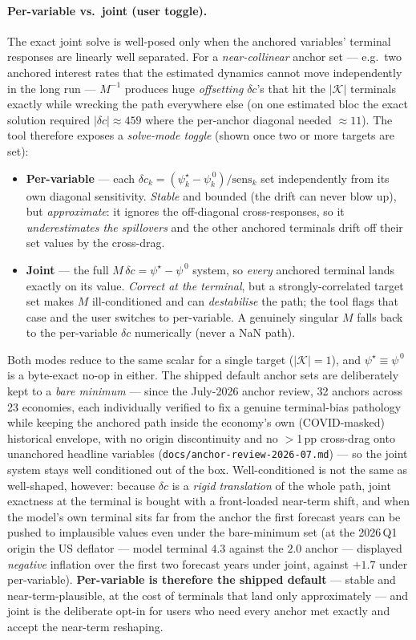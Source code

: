 \documentclass[11pt]{article}
\theoremstyle{definition}
\theoremstyle{remark}
\begin{document}
\paragraph{Per-variable vs.\ joint (user toggle).}
The exact joint solve is well-posed only when the anchored variables'
terminal responses are linearly well separated. For a \emph{near-collinear}
anchor set --- e.g.\ two anchored interest rates that the estimated
dynamics cannot move independently in the long run --- $M^{-1}$ produces
huge \emph{offsetting} $\delta c$'s that hit the $|\mathcal{K}|$ terminals
exactly while wrecking the path everywhere else (on one estimated bloc the
exact solution required $|\delta c|\approx 459$ where the per-anchor
diagonal needed $\approx 11$). The tool therefore exposes a \emph{solve-mode
toggle} (shown once two or more targets are set):
\begin{itemize}
\item \textbf{Per-variable} --- each $\delta c_k = (\psi^\star_k -
\psi^{\,0}_k)/\mathrm{sens}_k$ set independently from its own diagonal
sensitivity. \emph{Stable} and bounded (the drift can never blow up), but
\emph{approximate}: it ignores the off-diagonal cross-responses, so it
\emph{underestimates the spillovers} and the other anchored terminals drift
off their set values by the cross-drag.
\item \textbf{Joint} --- the full $M\,\delta c = \psi^\star -
\psi^{\,0}$ system, so \emph{every} anchored terminal lands exactly on its
value. \emph{Correct at the terminal}, but a strongly-correlated target set
makes $M$ ill-conditioned and can \emph{destabilise} the path; the tool
flags that case and the user switches to per-variable. A genuinely singular
$M$ falls back to the per-variable $\delta c$ numerically (never a NaN path).
\end{itemize}
Both modes reduce to the same scalar for a single target
($|\mathcal{K}|=1$), and $\psi^\star \equiv \psi^{\,0}$ is a byte-exact
no-op in either. The shipped default anchor sets are deliberately kept to a
\emph{bare minimum} --- since the July-2026 anchor review, 32 anchors across
23 economies, each individually verified to fix a genuine terminal-bias
pathology while keeping the anchored path inside the economy's own
(COVID-masked) historical envelope, with no origin discontinuity and no
$>$1\,pp cross-drag onto unanchored headline variables
(\texttt{docs/anchor-review-2026-07.md}) --- so the joint system stays well
conditioned out of the box. Well-conditioned is not the same as well-shaped, however: because
$\delta c$ is a \emph{rigid translation} of the whole path, joint exactness
at the terminal is bought with a front-loaded near-term shift, and when the
model's own terminal sits far from the anchor the first forecast years can
be pushed to implausible values even under the bare-minimum set (at the
2026\,Q1 origin the US deflator --- model terminal $4.3$ against the $2.0$
anchor --- displayed \emph{negative} inflation over the first two forecast
years under joint, against $+1.7$ under per-variable). \textbf{Per-variable
is therefore the shipped default} --- stable and near-term-plausible, at the
cost of terminals that land only approximately --- and joint is the
deliberate opt-in for users who need every anchor met exactly and accept
the near-term reshaping.
\end{document}
